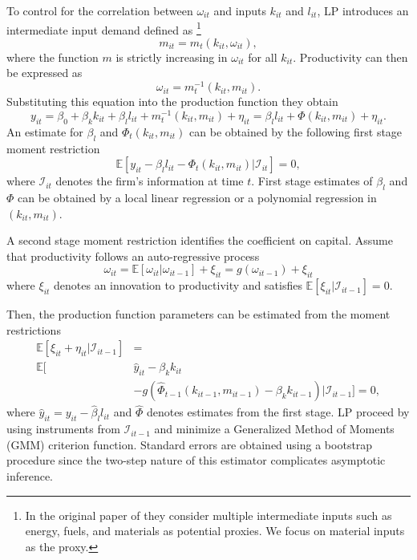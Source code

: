 \documentclass[11pt]{article}
\begin{document}
To control for the correlation between $\omega_{it}$ and inputs $k_{it}$ and $l_{it}$, LP introduces an intermediate input demand defined as \footnote{In the original paper of \cite{Levinsohn2003} they consider multiple intermediate inputs such as energy, fuels, and materials as potential proxies. We focus on material inputs as the proxy.}
\begin{equation}
m_{it}=m_{t}(k_{it}, \omega_{it}),
\end{equation}
where the function $m$ is strictly increasing in $\omega_{it}$ for all $k_{it}$. Productivity can then be expressed as
\begin{equation}
\omega_{it}=m_{t}^{-1}(k_{it}, m_{it}).
\end{equation}
Substituting this equation into the production function they obtain
\begin{equation}
y_{it}=\beta_{0}+\beta_{k}k_{it}+\beta_{l}l_{it}+m^{-1}_{t}(k_{it}, m_{it})+\eta_{it}=\beta_{l}l_{it}+\Phi(k_{it}, m_{it})+\eta_{it}.
\end{equation}
An estimate for $\beta_{l}$ and $\Phi_{t}(k_{it}, m_{it})$ can be obtained by the following first stage moment restriction
\begin{equation}
\mathbb{E}[y_{it}-\beta_{l}l_{it}-\Phi_{t}(k_{it}, m_{it})|\mathcal{I}_{it}]=0,
\end{equation}
where $\mathcal{I}_{it}$ denotes the firm's information at time $t$. First stage estimates of $\beta_{l}$ and $\Phi$ can be obtained by a local linear regression or a polynomial regression in $(k_{it}, m_{it})$.

A second stage moment restriction identifies the coefficient on capital. Assume that productivity follows an auto-regressive process
\begin{equation}
\omega_{it}=\mathbb{E}[\omega_{it}|\omega_{it-1}]+\xi_{it}=g(\omega_{it-1})+\xi_{it}
\end{equation}
where $\xi_{it}$ denotes an innovation to productivity and satisfies $\mathbb{E}[\xi_{it}|\mathcal{I}_{it-1}]=0$.

Then, the production function parameters can be estimated from the moment restrictions
\begin{equation}
\begin{split}
\mathbb{E}[\xi_{it}+\eta_{it}|\mathcal{I}_{it-1}]&=\\
\mathbb{E}[&\hat{y}_{it}-\beta_{k}k_{it}\\
&-g(\hat{\Phi}_{t-1}(k_{it-1}, m_{it-1})-\beta_{k}k_{it-1})|\mathcal{I}_{it-1}]=0,
\end{split}
\end{equation}
where $\hat{y}_{it}=y_{it}-\hat{\beta}_{l}l_{it}$ and $\hat{\Phi}$ denotes estimates from the first stage. LP proceed by using instruments from $\mathcal{I}_{it-1}$ and minimize a Generalized Method of Moments (GMM) criterion function. Standard errors are obtained using a bootstrap procedure since the two-step nature of this estimator complicates asymptotic inference.
\end{document}
